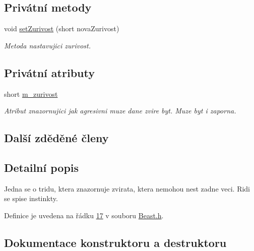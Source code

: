 \subsection*{Privátní metody}
\begin{DoxyCompactItemize}
\item 
void \hyperlink{classIceAge_1_1Beast_a3be2043a37d885dc4a9ecb0e12674f15}{set\+Zurivost} (short nova\+Zurivost)
\begin{DoxyCompactList}\small\item\em Metoda nastavujici zurivost. \end{DoxyCompactList}\end{DoxyCompactItemize}
\subsection*{Privátní atributy}
\begin{DoxyCompactItemize}
\item 
short \hyperlink{classIceAge_1_1Beast_a4ab89bf8c404db2afa13f83dd893098b}{m\+\_\+zurivost}
\begin{DoxyCompactList}\small\item\em Atribut znazornujici jak agresivni muze dane zvire byt. Muze byt i zaporna. \end{DoxyCompactList}\end{DoxyCompactItemize}
\subsection*{Další zděděné členy}


\subsection{Detailní popis}
Jedna se o tridu, ktera znazornuje zvirata, ktera nemohou nest zadne veci. Ridi se spise instinkty. 

Definice je uvedena na řádku \hyperlink{Beast_8h_source_l00017}{17} v souboru \hyperlink{Beast_8h_source}{Beast.\+h}.



\subsection{Dokumentace konstruktoru a destruktoru}
